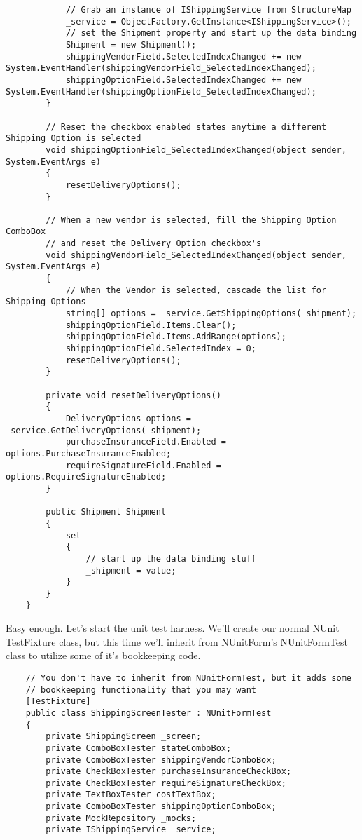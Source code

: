 \documentclass{article}
\begin{document}
{\begin{lstlisting}
            // Grab an instance of IShippingService from StructureMap
            _service = ObjectFactory.GetInstance<IShippingService>();
            // set the Shipment property and start up the data binding
            Shipment = new Shipment();
            shippingVendorField.SelectedIndexChanged += new System.EventHandler(shippingVendorField_SelectedIndexChanged);
            shippingOptionField.SelectedIndexChanged += new System.EventHandler(shippingOptionField_SelectedIndexChanged);
        }

        // Reset the checkbox enabled states anytime a different Shipping Option is selected
        void shippingOptionField_SelectedIndexChanged(object sender, System.EventArgs e)
        {
            resetDeliveryOptions();
        } 

        // When a new vendor is selected, fill the Shipping Option ComboBox
        // and reset the Delivery Option checkbox's
        void shippingVendorField_SelectedIndexChanged(object sender, System.EventArgs e)
        {
            // When the Vendor is selected, cascade the list for Shipping Options
            string[] options = _service.GetShippingOptions(_shipment);
            shippingOptionField.Items.Clear();
            shippingOptionField.Items.AddRange(options);
            shippingOptionField.SelectedIndex = 0;
            resetDeliveryOptions();
        } 

        private void resetDeliveryOptions()
        {
            DeliveryOptions options = _service.GetDeliveryOptions(_shipment);
            purchaseInsuranceField.Enabled = options.PurchaseInsuranceEnabled;
            requireSignatureField.Enabled = options.RequireSignatureEnabled;
        } 

        public Shipment Shipment
        {
            set
            {
                // start up the data binding stuff
                _shipment = value;
            }
        }
    }
\end{lstlisting}	

Easy enough.  Let's start the unit test harness.  We'll create our normal NUnit TestFixture class, but this time we'll inherit from NUnitForm's NUnitFormTest class to utilize some of it's bookkeeping code.
\newpage
 \begin{lstlisting}
    // You don't have to inherit from NUnitFormTest, but it adds some
    // bookkeeping functionality that you may want
    [TestFixture]
    public class ShippingScreenTester : NUnitFormTest
    {
        private ShippingScreen _screen;
        private ComboBoxTester stateComboBox;
        private ComboBoxTester shippingVendorComboBox;
        private CheckBoxTester purchaseInsuranceCheckBox;
        private CheckBoxTester requireSignatureCheckBox;
        private TextBoxTester costTextBox;
        private ComboBoxTester shippingOptionComboBox;
        private MockRepository _mocks;
        private IShippingService _service; 


\end{lstlisting}}
\end{document}
